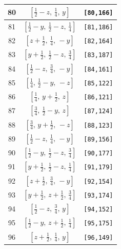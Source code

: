 \documentclass[fleqn,8pt]{jsarticle}
\begin{document}
\begin{longtable}{ccc}
80 & $\left[ \frac{1}{2} - z,\, \frac{1}{4},\, y \right]$ & {\tt [80,166]} \\ \hline
81 & $\left[ \frac{1}{2} - y,\, \frac{1}{2} - z,\, \frac{1}{4} \right]$ & {\tt [81,186]} \\ \hline
82 & $\left[ z + \frac{1}{2},\, \frac{1}{4},\, - y \right]$ & {\tt [82,164]} \\ \hline
83 & $\left[ y + \frac{1}{2},\, \frac{1}{2} - z,\, \frac{3}{4} \right]$ & {\tt [83,187]} \\ \hline
84 & $\left[ \frac{1}{2} - z,\, \frac{3}{4},\, - y \right]$ & {\tt [84,161]} \\ \hline
85 & $\left[ \frac{1}{4},\, \frac{1}{2} - y,\, - z \right]$ & {\tt [85,122]} \\ \hline
86 & $\left[ \frac{1}{4},\, y + \frac{1}{2},\, z \right]$ & {\tt [86,121]} \\ \hline
87 & $\left[ \frac{3}{4},\, \frac{1}{2} - y,\, z \right]$ & {\tt [87,124]} \\ \hline
88 & $\left[ \frac{3}{4},\, y + \frac{1}{2},\, - z \right]$ & {\tt [88,123]} \\ \hline
89 & $\left[ \frac{1}{2} - z,\, \frac{1}{4},\, - y \right]$ & {\tt [89,156]} \\ \hline
90 & $\left[ \frac{1}{2} - y,\, \frac{1}{2} - z,\, \frac{3}{4} \right]$ & {\tt [90,177]} \\ \hline
91 & $\left[ y + \frac{1}{2},\, \frac{1}{2} - z,\, \frac{1}{4} \right]$ & {\tt [91,179]} \\ \hline
92 & $\left[ z + \frac{1}{2},\, \frac{3}{4},\, - y \right]$ & {\tt [92,154]} \\ \hline
93 & $\left[ y + \frac{1}{2},\, z + \frac{1}{2},\, \frac{3}{4} \right]$ & {\tt [93,174]} \\ \hline
94 & $\left[ \frac{1}{2} - z,\, \frac{3}{4},\, y \right]$ & {\tt [94,152]} \\ \hline
95 & $\left[ \frac{1}{2} - y,\, z + \frac{1}{2},\, \frac{1}{4} \right]$ & {\tt [95,175]} \\ \hline
96 & $\left[ z + \frac{1}{2},\, \frac{1}{4},\, y \right]$ & {\tt [96,149]} \\
\end{longtable}
\renewcommand{\arraystretch}{1.2}
\end{document}
